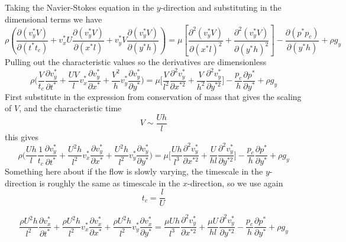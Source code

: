 Taking the Navier-Stokes equation in the $y$-direction and substituting in the dimensional terms we have
\begin{equation*}
  \rho\left(\frac{\partial(v_{y}^{*}V)}{\partial(t^{*}t_{c})}+v_{x}^{*}U\frac{\partial(v_{y}^{*}V)}{\partial(x^{*}l)}+v_{y}^{*}V\frac{\partial(v_{y}^{*}V)}{\partial(y^{*}h)}\right)=\mu\left[\frac{\partial^{2}(v_{y}^{*}V)}{\partial(x^{*}l)^{2}}+\frac{\partial^{2}(v_{y}^{*}V)}{\partial{}(y^{*}h)^{2}}\right]-\frac{\partial(p^{*}p_{c})}{\partial(y^{*}h)}+\rho{}g_{y}
\end{equation*}
Pulling out the characteristic values so the derivatives are dimensionless
\begin{equation*}
  \rho\biggr(\frac{V}{t_{c}}\frac{\partial{}v_{y}^{*}}{\partial{}t^{*} }+\frac{UV}{l}v_{x}^{*}\frac{\partial{}v_{y}^{*}}{\partial{}x^{*}}+\frac{V^{2}}{h}v_{y}^{*}\frac{\partial{}v_{y}^{*}}{\partial{}y^{*}}\biggr)=\mu\biggr[\frac{V}{l^{2}}\frac{\partial^{2}v_{y}^{*}}{\partial{}x^{*2}}+\frac{V}{h^{2}}\frac{\partial^{2}v_{y}^{*}}{\partial{}y^{*2}}\biggr]-\frac{p_{c}}{h}\frac{\partial{}p^{*}}{\partial{}y^{*}}+\rho{}g_{y}
\end{equation*}
First substitute in the expression from conservation of mass that gives the scaling of $V$, and the characteristic time
\begin{equation*}
  V\sim\frac{Uh}{l}
\end{equation*}
this gives
\begin{equation*}
  \rho\biggr(\frac{Uh}{l}\frac{1}{t_{c}}\frac{\partial{}v_{y}^{*}}{\partial{}t^{*} }+\frac{U^{2}h}{l^{2}}v_{x}^{*}\frac{\partial{}v_{y}^{*}}{\partial{}x^{*}}+\frac{U^{2}h}{l^{2}}v_{y}^{*}\frac{\partial{}v_{y}^{*}}{\partial{}y^{*}}\biggr)=\mu\biggr[\frac{Uh}{l^{3}}\frac{\partial^{2}v_{y}^{*}}{\partial{}x^{*2}}+\frac{U}{hl}\frac{\partial^{2}v_{y}^{*}}{\partial{}y^{*2}}\biggr]-\frac{p_{c}}{h}\frac{\partial{}p^{*}}{\partial{}y^{*}}+\rho{}g_{y}
\end{equation*}
Something here about if the flow is slowly varying, the timescale in the $y$-direction is roughly the same as timescale in the $x$-direction, so we use again
\begin{equation*}
  t_{c}=\frac{l}{U}
\end{equation*}

\begin{equation*}
  \frac{\rho{}U^{2}h}{l^{2}}\frac{\partial{}v_{x}^{*}}{\partial{}t^{*} }+\frac{\rho{}U^{2}h}{l^{2}}v_{x}^{*}\frac{\partial{}v_{x}^{*}}{\partial{}x^{*}}+\frac{\rho{}U^{2}h}{l^{2}}v_{y}^{*}\frac{\partial{}v_{x}^{*}}{\partial{}y^{*}}=\frac{\mu{}Uh}{l^{3}}\frac{\partial^{2}v_{y}^{*}}{\partial{}x^{*2}}+\frac{\mu{}U}{hl}\frac{\partial^{2}v_{y}^{*}}{\partial{}y^{*2}}-\frac{p_{c}}{h}\frac{\partial{}p^{*}}{\partial{}y^{*}}+\rho{}g_{y}
\end{equation*}

